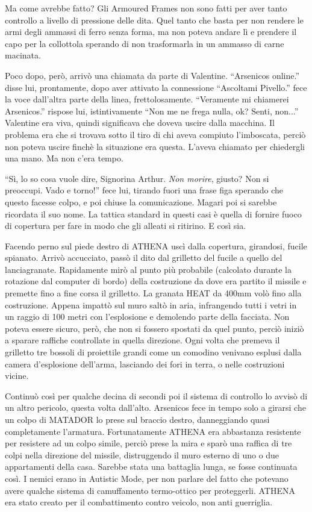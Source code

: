     Ma come avrebbe fatto? Gli Armoured Frames non sono fatti per aver tanto controllo a livello di pressione delle
    dita. Quel tanto che basta per non rendere le armi degli ammassi di ferro senza forma, ma non poteva andare lì e
    prendere il capo per la collottola sperando di non trasformarla in un ammasso di carne macinata.

    Poco dopo, però, arrivò una chiamata da parte di Valentine. ``Arsenicos online.'' disse lui, prontamente, dopo aver
    attivato la connessione ``Ascoltami Pivello.'' fece la voce dall'altra parte della linea, frettolosamente.
    ``Veramente mi chiamerei Arsenicos.'' rispose lui, istintivamente ``Non me ne frega nulla, ok? Senti, non...''
    Valentine era viva, quindi significava che doveva uscire dalla macchina. Il problema era che si trovava sotto il
    tiro di chi aveva compiuto l'imboscata, perciò non poteva uscire finchè la situazione era questa. L'aveva chiamato
    per chiedergli una mano. Ma non c'era tempo.
    
    ``Sì, lo so cosa vuole dire, Signorina Arthur. \emph{Non morire}, giusto? Non si preoccupi. Vado e torno!'' fece
    lui, tirando fuori una frase figa sperando che questo facesse colpo, e poi chiuse la comunicazione. Magari poi si
    sarebbe ricordata il suo nome. La tattica standard in questi casi è quella di fornire fuoco di copertura per fare in
    modo che gli alleati si ritirino. E così sia.

    Facendo perno sul piede destro di ATHENA uscì dalla copertura, girandosi, fucile spianato. Arrivò accucciato, passò
    il dito dal grilletto del fucile a quello del lanciagranate. Rapidamente mirò al punto più probabile (calcolato
    durante la rotazione dal computer di bordo) della costruzione da dove era partito il missile e premette fino a fine
    corsa il grilletto. La granata HEAT da 400mm volò fino alla costruzione. Appena impattò sul muro saltò in aria,
    infrangendo tutti i vetri in un raggio di 100 metri con l'esplosione e demolendo parte della facciata. Non poteva
    essere sicuro, però, che non si fossero spostati da quel punto, perciò iniziò a sparare raffiche controllate in
    quella direzione. Ogni volta che premeva il grilletto tre bossoli di proiettile grandi come un comodino venivano
    esplusi dalla camera d'esplosione dell'arma, lasciando dei fori in terra, o nelle costruzioni vicine.

    Continuò così per qualche decina di secondi poi il sistema di controllo lo avvisò di un altro pericolo, questa volta
    dall'alto. Arsenicos fece in tempo solo a girarsi che un colpo di MATADOR lo prese sul braccio destro, danneggiando
    quasi completamente l'armatura. Fortunatamente ATHENA era abbastanza resistente per resistere ad un colpo simile,
    perciò prese la mira e sparò una raffica di tre colpi nella direzione del missile, distruggendo il muro esterno di
    uno o due appartamenti della casa. Sarebbe stata una battaglia lunga, se fosse continuata così. I nemici erano in
    Autistic Mode, per non parlare del fatto che potevano avere qualche sistema di camuffamento termo-ottico per
    proteggerli. ATHENA era stato creato per il combattimento contro veicolo, non anti guerriglia.

